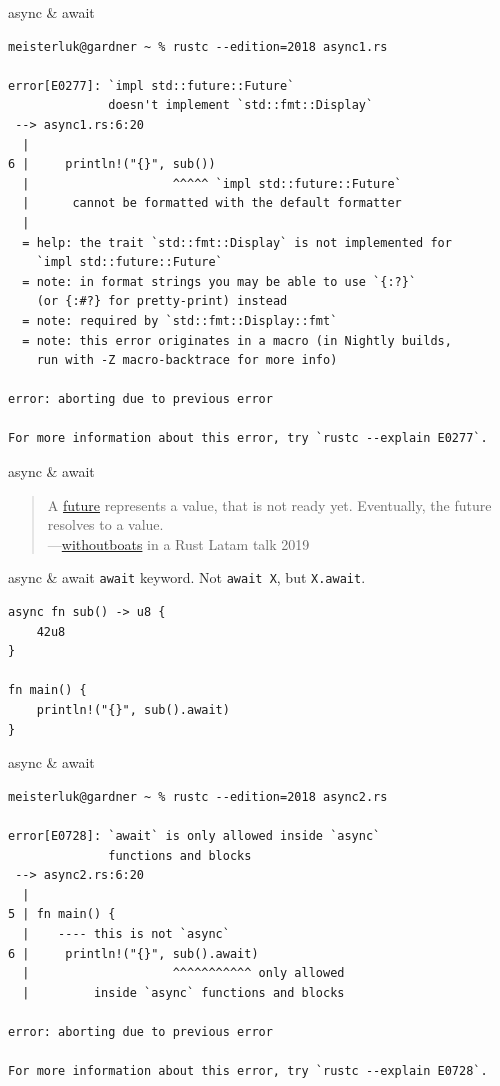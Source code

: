 \documentclass{beamer}
\begin{document}
\begin{frame}[fragile]{async \& await}
  \begin{verbatim}
meisterluk@gardner ~ % rustc --edition=2018 async1.rs

error[E0277]: `impl std::future::Future`
              doesn't implement `std::fmt::Display`
 --> async1.rs:6:20
  |
6 |     println!("{}", sub())
  |                    ^^^^^ `impl std::future::Future`
  |      cannot be formatted with the default formatter
  |
  = help: the trait `std::fmt::Display` is not implemented for
    `impl std::future::Future`
  = note: in format strings you may be able to use `{:?}`
    (or {:#?} for pretty-print) instead
  = note: required by `std::fmt::Display::fmt`
  = note: this error originates in a macro (in Nightly builds,
    run with -Z macro-backtrace for more info)

error: aborting due to previous error

For more information about this error, try `rustc --explain E0277`.
  \end{verbatim}
\end{frame}

\begin{frame}[fragile]{async \& await}
  \begin{quote}
  A \href{https://doc.rust-lang.org/std/future/trait.Future.html}{future} represents a value, that is not ready yet. Eventually, the future resolves to a value. \\
  ---\href{https://www.youtube.com/watch?v=skos4B5x7qE}{withoutboats} in a Rust Latam talk 2019
  \end{quote}
\end{frame}

\begin{frame}[fragile]{async \& await}
  \texttt{await} keyword.
  Not \texttt{await X}, but \texttt{X.await}.

  \begin{verbatim}
async fn sub() -> u8 {
    42u8
}

fn main() {
    println!("{}", sub().await)
}
  \end{verbatim}
\end{frame}

\begin{frame}[fragile]{async \& await}
  \begin{verbatim}
meisterluk@gardner ~ % rustc --edition=2018 async2.rs

error[E0728]: `await` is only allowed inside `async`
              functions and blocks
 --> async2.rs:6:20
  |
5 | fn main() {
  |    ---- this is not `async`
6 |     println!("{}", sub().await)
  |                    ^^^^^^^^^^^ only allowed
  |         inside `async` functions and blocks

error: aborting due to previous error

For more information about this error, try `rustc --explain E0728`.
  \end{verbatim}
\end{frame}
\end{document}
